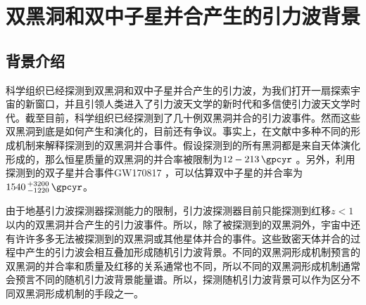 \chapter{双黑洞和双中子星并合产生的引力波背景}\label{chap:SGWB}



\section{背景介绍}

\lvc 科学组织已经探测到双黑洞和双中子星并合产生的引力波\citep{TheLIGOScientific:2016pea,TheLIGOScientific:2016qqj,Abbott:2016nmj,Abbott:2016blz,    TheLIGOScientific:2017qsa,Abbott:2017vtc,Abbott:2017gyy,Abbott:2017oio}，为我们打开一扇探索宇宙的新窗口，并且引领人类进入了引力波天文学的新时代和多信使引力波天文学时代。截至目前，\lvc 科学组织已经探测到了几十例双黑洞并合的引力波事件。然而这些双黑洞到底是如何产生和演化的，目前还有争议。事实上，在文献中多种不同的形成机制来解释\lvc 探测到的双黑洞并合事件。假设\lvc 探测到的所有黑洞都是来自天体演化形成的，那么恒星质量的双黑洞的并合率被限制为$12-213\, \gpcyr$ \citep{Abbott:2017vtc}。另外，利用探测到的双子星并合事件GW170817 \citep{TheLIGOScientific:2017qsa}，可以估算双中子星的并合率为$1540\,^{+3200}_{-1220}\, \gpcyr$。

由于地基引力波探测器探测能力的限制，\lvc 引力波探测器目前只能探测到红移$z<1$以内的双黑洞并合产生的引力波事件\citep{TheLIGOScientific:2016htt,Aasi:2013wya}。所以，除了被\lvc 探测到的双黑洞外，宇宙中还有许许多多无法被\lvc 探测到的双黑洞或其他星体并合的事件。这些致密天体并合的过程中产生的引力波会相互叠加形成随机引力波背景\citep{Christensen:1992wi}。不同的双黑洞形成机制预言的双黑洞的并合率和质量及红移的关系通常也不同，所以不同的双黑洞形成机制通常会预言不同的随机引力波背景能量谱。所以，探测随机引力波背景可以作为区分不同双黑洞形成机制的手段之一。

